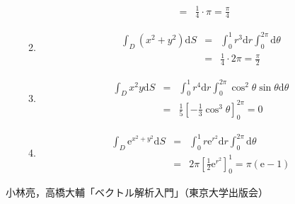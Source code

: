 \documentclass{jarticle}
\newcommand{\e}[1]{\tilde E^{({#1})}}
\def\d{\mathrm d}
\def\e{\mathrm{e}}
\begin{document}
\begin{enumerate}
\begin{enumerate}
\begin{eqnarray*}
            & = & \frac{1}{4} \cdot \pi = \frac{\pi}{4}
          \end{eqnarray*}
        \item
          \begin{eqnarray*}
            \int_{D} (x^2+y^2) \d S & = & \int_0^1 r^3 \d r \int_0^{2\pi} \d \theta \\
            & = & \frac{1}{4} \cdot 2\pi = \frac{\pi}{2}
          \end{eqnarray*}
        \item
          \begin{eqnarray*}
            \int_{D} x^2y \d S & = & \int_0^1 r^4 \d r \int_0^{2\pi} \cos^2 \theta \sin \theta \d \theta \\
            & = & \frac{1}{5} \left[ -\frac{1}{3} \cos^3 \theta \right]_0^{2\pi} = 0
          \end{eqnarray*}
        \item
          \begin{eqnarray*}
            \int_{D} \e^{x^2+y^2} \d S & = & \int_0^1 r \e^{r^2} \d r \int_0^{2\pi} \d \theta \\
            & = & 2 \pi \left[ \frac{1}{2} \e^{r^2} \right]_0^1 = \pi ( \e - 1 )
          \end{eqnarray*}
      \end{enumerate}
  \end{enumerate}
  
\newpage

\begin{thebibliography}{99}
 小林亮，高橋大輔「ベクトル解析入門」（東京大学出版会）
\end{thebibliography}
\end{document}
